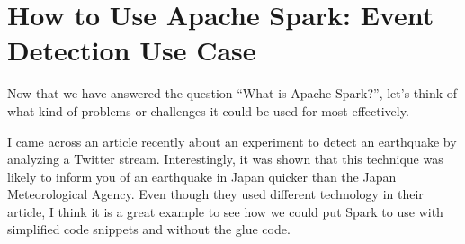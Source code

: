 \documentclass[a4paper,12pt]{article}
\begin{document}
\section*{How to Use Apache Spark: Event Detection Use Case}

Now that we have answered the question “What is Apache Spark?”, let’s think of what kind of problems or challenges it could be used for most effectively.

I came across an article recently about an experiment to detect an earthquake by analyzing a Twitter stream. Interestingly, it was shown that this technique was likely to inform you of an earthquake in Japan quicker than the Japan Meteorological Agency. Even though they used different technology in their article, I think it is a great example to see how we could put Spark to use with simplified code snippets and without the glue code.
\end{document}
